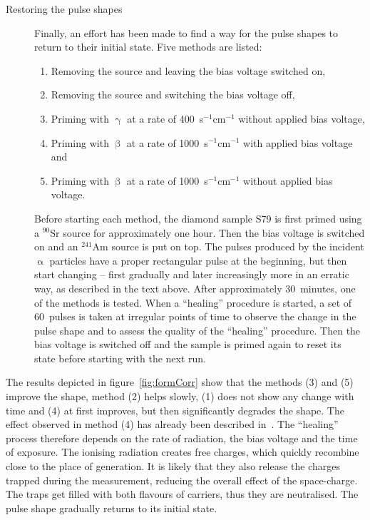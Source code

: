 \begin{description}
\item[Restoring the pulse shapes] Finally, an effort has been made to find a way for the pulse shapes to return to their initial state. Five methods are listed: 
\begin{enumerate}[itemsep=0.1\baselineskip]
\item Removing the source and leaving the bias voltage switched on, 
\item Removing the source and switching the bias voltage off, 
\item Priming with $\upgamma$ at a rate of 400~s$^{-1}$cm$^{-1}$ without applied bias voltage, 
\item Priming with $\upbeta$ at a rate of 1000~s$^{-1}$cm$^{-1}$ with applied bias voltage and 
\item Priming with $\upbeta$ at a rate of 1000~s$^{-1}$cm$^{-1}$ without applied bias voltage. 
\end{enumerate}
Before starting each method, the diamond sample S79 is first primed using a $^{90}$Sr source for approximately one hour. Then the bias voltage is switched on and an $^{241}$Am source is put on top. The pulses produced by the incident $\upalpha$ particles have a proper rectangular pulse at the beginning, but then start changing -- first gradually and later increasingly more in an erratic way, as described in the text above. After approximately 30~minutes, one of the methods is tested. When a ``healing'' procedure is started, a set of 60~pulses is taken at irregular points of time to observe the change in the pulse shape and to assess the quality of the ``healing'' procedure. Then the bias voltage is switched off and the sample is primed again to reset its state before starting with the next run. 
\end{description}
The results depicted in figure~\ref{fig:formCorr} show that the methods (3) and (5) improve the shape, method (2) helps slowly, (1) does not show any change with time and (4) at first improves, but then significantly degrades the shape. The effect observed in method (4) has already been described in~\cite{Kramberger:2013wva}. The ``healing'' process therefore depends on the rate of radiation, the bias voltage and the time of exposure. The ionising radiation creates free charges, which quickly recombine close to the place of generation. It is likely that they also release the charges trapped during the measurement, reducing the overall effect of the space-charge. The traps get filled with both flavours of carriers, thus they are neutralised. The pulse shape gradually returns to its initial state.


